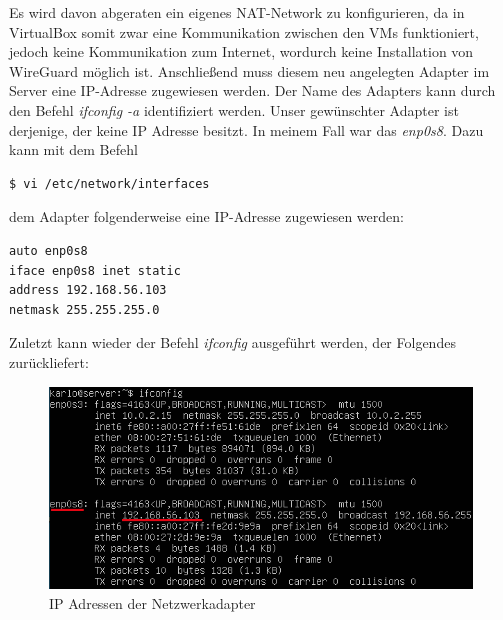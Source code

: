 Es wird davon abgeraten ein eigenes NAT-Network zu konfigurieren, da in VirtualBox somit zwar eine Kommunikation zwischen den VMs funktioniert, jedoch keine Kommunikation zum Internet, wordurch keine Installation von WireGuard möglich ist. \newpage \noindent
Anschließend muss diesem neu angelegten Adapter im Server eine IP-Adresse zugewiesen werden. Der Name des Adapters kann durch den Befehl \textit{ifconfig -a} identifiziert werden. Unser gewünschter Adapter ist derjenige, der keine IP Adresse besitzt. In meinem Fall war das \textit{enp0s8}. Dazu kann mit dem Befehl 
\begin{lstlisting}
$ vi /etc/network/interfaces
\end{lstlisting}
dem Adapter folgenderweise eine IP-Adresse zugewiesen werden:
\begin{lstlisting}
auto enp0s8
iface enp0s8 inet static
address 192.168.56.103
netmask 255.255.255.0
\end{lstlisting}
Zuletzt kann wieder der Befehl \textit{ifconfig} ausgeführt werden, der Folgendes zurückliefert:
\begin{figure}[H]
  \centering
  \includegraphics[scale=0.7]{images/ifconfig.PNG}
  \caption{IP Adressen der Netzwerkadapter}
\end{figure} \noindent

